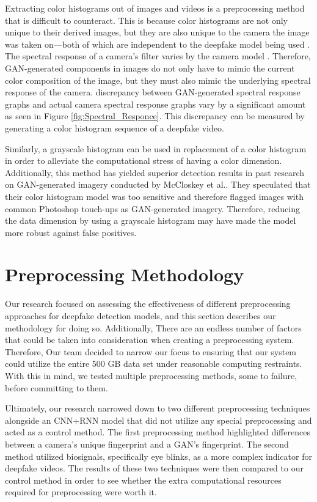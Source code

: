 \documentclass[a4paper]{article}
\begin{document}
Extracting color histograms out of images and videos is a preprocessing method that is difficult to counteract. This is because color histograms are not only unique to their derived images, but they are also unique to the camera the image was taken on—both of which are independent to the deepfake model being used \cite{Color_Cues}. The spectral response of a camera’s filter varies by the camera model \cite{Canon}. Therefore, GAN-generated components in images do not only have to mimic the current color composition of the image, but they must also mimic the underlying spectral response of the camera. discrepancy between GAN-generated spectral response graphs and actual camera spectral response graphs vary by a significant amount as seen in Figure \ref{fig:Spectral_Responce}. This discrepancy can be measured by generating a color histogram sequence of a deepfake video.

\par
Similarly, a grayscale histogram can be used in replacement of a color histogram in order to alleviate the computational stress of having a color dimension. Additionally, this method has yielded superior detection results in past research on GAN-generated imagery conducted by McCloskey et al.\cite{Color_Cues}. They speculated that their color histogram model was too sensitive and therefore flagged images with common Photoshop touch-ups as GAN-generated imagery. Therefore, reducing the data dimension by using a grayscale histogram may have made the model more robust against false positives.

\section{Preprocessing Methodology}

Our research focused on assessing the effectiveness of different preprocessing approaches for deepfake detection models, and this section describes our methodology for doing so. Additionally, There are an endless number of factors that could be taken into consideration when creating a preprocessing system. Therefore, Our team decided to narrow our focus to ensuring that our system could utilize the entire 500 GB data set under reasonable computing restraints. With this in mind, we tested multiple preprocessing methods, some to failure, before committing to them.

\par
Ultimately, our research narrowed down to two different preprocessing techniques alongside an CNN+RNN model that did not utilize any special preprocessing and acted as a control method. The first preprocessing method highlighted differences between a camera’s unique fingerprint and a GAN’s fingerprint. The second method utilized biosignals, specifically eye blinks, as a more complex indicator for deepfake videos. The results of these two techniques were then compared to our control method in order to see whether the extra computational resources required for preprocessing were worth it.
\end{document}
